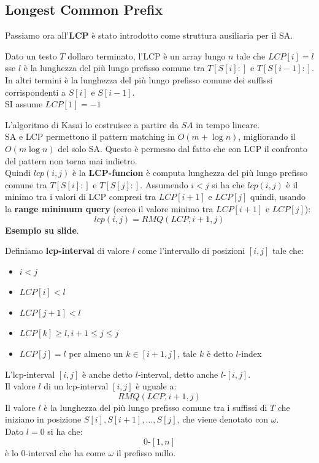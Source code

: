 \documentclass[a4paper,12pt, oneside]{book}
\begin{document}
\subsection{Longest Common Prefix}
Passiamo ora all'\textbf{LCP} è stato introdotto come struttura ausiliaria per
il SA.
\begin{definizione}
  Dato un testo $T$ dollaro terminato, l'LCP è un array lungo $n$ tale che
  $LCP[i]=l$ sse $l$ è la lunghezza del più lungo prefisso comune tra $T[S[i]:]$
  e $T[S[i-1]:]$. In altri termini è la lunghezza del più lungo prefisso comune
  dei suffissi corrispondenti a $S[i]$ e $S[i-1]$.\\
  SI assume $LCP[1]=-1$
\end{definizione}
L'algoritmo di Kasai lo costruisce a partire da $SA$ in tempo lineare.\\
SA e LCP permettono il pattern matching in $O(m+\log n)$, migliorando il
$O(m\log n)$ del solo SA. Questo è permesso dal fatto che con LCP il confronto
del pattern non torna mai indietro. \\
Quindi $lcp(i,j)$ è la \textbf{LCP-funcion} è computa lunghezza del più lungo
prefisso comune tra $T[S[i]:]$ e $T[S[j]:]$. Assumendo $i<j$ si ha che
$lcp(i,j)$ è il minimo tra i valori di LCP compresi tra $LCP[i+1]$ e $LCP[j]$
quindi, usando la \textbf{range minimum query} (cerco il valore minimo tra
$LCP[i+1]$ e $LCP[j]$): 
\[lcp(i,j)=RMQ(LCP, i+1,j)\]
\textbf{Esempio su slide}.
\begin{definizione}
  Definiamo \textbf{lcp-interval} di valore $l$ come l'intervallo di
  posizioni $[i,j]$ tale che:
  \begin{itemize}
    \item $i< j$
    \item $LCP[i]<l$
    \item $LCP[j+1]<l$
    \item $LCP[k]\geq l, i+1\leq j\leq j$
    \item $LCP[j]=l$ per almeno un $k\in[i+1,j]$, tale $k$ è detto
    $l$-index 
  \end{itemize}
  L'lcp-interval $[i,j]$ è anche detto $l$-interval, detto anche
  $l$-$[i,j]$. \\
  Il valore $l$ di un lcp-interval $[i,j]$ è uguale a:
  \[RMQ(LCP, i+1,j)\]
  Il valore $l$ è la lunghezza del più lungo prefisso comune tra i
  suffissi di $T$ che iniziano in posizione $S[i], S[i+1], \ldots, S[j]$, che
  viene denotato con $\omega$.\\
  Dato $l=0$ si ha che:
  \[0\mbox{-}[1,n]\]
  è lo 0-interval che ha come $\omega$ il prefisso nullo.
\end{definizione}
\end{document}
